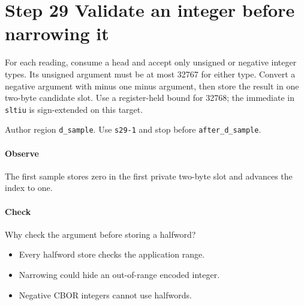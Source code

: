 \section{Step 29 Validate an integer before narrowing it}\label{cbor-s29}
For each reading, consume a head and accept only unsigned or negative integer types. Its unsigned argument must be at most 32767 for either type. Convert a negative argument with minus one minus argument, then store the result in one two-byte candidate slot. Use a register-held bound for 32768; the immediate in \texttt{sltiu} is sign-extended on this target.

Author region \texttt{d\_sample}. Use \texttt{s29-1} and stop before \texttt{after\_d\_sample}.

\paragraph{Observe} The first sample stores zero in the first private two-byte slot and advances the index to one.

\paragraph{Check} Why check the argument before storing a halfword?
\begin{itemize}
\item[A.] Every halfword store checks the application range.
\item[B.] Narrowing could hide an out-of-range encoded integer.
\item[C.] Negative CBOR integers cannot use halfwords.
\end{itemize}
